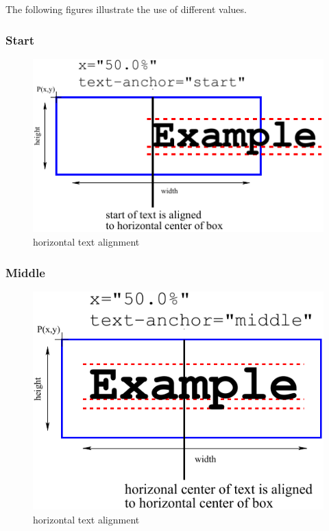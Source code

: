 The following figures illustrate the use of different \HTextAnchor values.

\subsubsection{Start}

\begin{figure}[h!]
\begin{center}
\includegraphics{figures/HorizontalTextPlacement_Start.pdf}
\end{center}
\caption{horizontal text alignment }
\label{HorizontalTextPlacement_Start}
\end{figure}

\subsubsection{Middle}

\begin{figure}[h!]
\begin{center}
\includegraphics{figures/HorizontalTextPlacement_Middle.pdf}
\end{center}
\caption{horizontal text alignment }
\label{HorizontalTextPlacement_Middle}
\end{figure}

